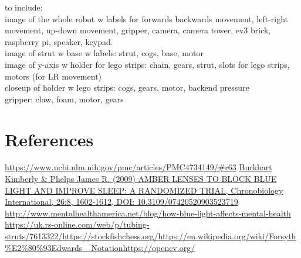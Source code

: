 \documentclass[onecolumn]{IEEEtran}
\begin{document}
to include:\\
image of the whole robot w labels for forwards backwards movement, left-right movement, up-down movement, gripper, camera, camera tower, ev3 brick, raspberry pi, speaker, keypad. \\
image of strut w base w labels: strut, cogs, base, motor\\
image of y-axis w holder for lego strips: chain, gears, strut, slots for lego strips, motors (for LR movement)\\
closeup of holder w lego strips: cogs, gears, motor, backend pressure\\
gripper: claw, foam, motor, gears\\


\section{References}
\noindent [1] \href{https://www.ncbi.nlm.nih.gov/pmc/articles/PMC4734149/\#r63}{https://www.ncbi.nlm.nih.gov/pmc/articles/PMC4734149/\#r63} \newline
[2] \href{https://www.tandfonline.com/doi/abs/10.3109/07420520903523719?casa_token=xuj5yeT4EWEAAAAA\%3ADS5C1NhfiI1XBogq05OfmNmXPNALfdGdCkl8oOSUKUsNgLJZQW5dzziJ_a5yXX3H1YCVc57m8jc\&}{Burkhart Kimberly \& Phelps James R. (2009) AMBER LENSES TO BLOCK BLUE LIGHT AND IMPROVE SLEEP: A RANDOMIZED TRIAL, Chronobiology International, 26:8, 1602-1612, DOI: 10.3109/07420520903523719} \newline
[3] \href{http://www.mentalhealthamerica.net/blog/how-blue-light-affects-mental-health}{http://www.mentalhealthamerica.net/blog/how-blue-light-affects-mental-health} \newline
[4]\href{https://uk.rs-online.com/web/p/tubing-struts/7613322/}{https://uk.rs-online.com/web/p/tubing-struts/7613322/}\newline
[5]\href{https://stockfishchess.org/}{https://stockfishchess.org/}\newline
[6]\href{https://en.wikipedia.org/wiki/Forsyth\%E2\%80\%93Edwards\_ Notation}
{https://en.wikipedia.org/wiki/Forsyth\%E2\%80\%93Edwards\_ Notation}\newline
[7]\href{https://opencv.org/}{https://opencv.org/}
\end{document}
